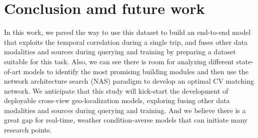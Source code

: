 \documentclass[10pt,letterpaper]{article}
\begin{document}
\section*{Conclusion amd future work}
In this work, we paved the way to use this dataset to build an end-to-end model that exploits the temporal correlation during a single trip, and fuses other data modalities and sources during querying and training by preparing a dataset suitable for this task. Also, we can see there is room for analyzing different state-of-art models to identify the most promising building modules and then use the network architecture search (NAS) paradigm to develop an optimal CV matching network. We anticipate that this study will kick-start the development of deployable cross-view geo-localization models, exploring fusing other data modalities and sources during querying and training. And we believe there is a great gap for real-time, weather condition-averse models that can initiate many research points.

\nolinenumbers
\FloatBarrier
\end{document}
